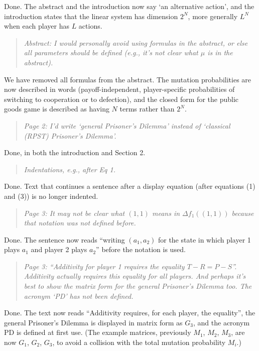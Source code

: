 \documentclass[11pt]{article}
\newenvironment{reviewerquote}
  {\begin{quote}\itshape}
  {\end{quote}}
\begin{document}
Done. The abstract and the introduction now say `an alternative action', and
the introduction states that the linear system has dimension \(2^N\), more
generally \(L^N\) when each player has \(L\) actions.

\begin{reviewerquote}
Abstract: I would personally avoid using formulas in the abstract, or else
all parameters should be defined (e.g., it's not clear what \(\mu\) is in the
abstract).
\end{reviewerquote}

We have removed all formulas from the abstract. The mutation probabilities
are now described in words (payoff-independent, player-specific probabilities
of switching to cooperation or to defection), and the closed form for the
public goods game is described as having \(N\) terms rather than \(2^N\).

\begin{reviewerquote}
Page 2: I'd write `general Prisoner's Dilemma' instead of `classical (RPST)
Prisoner's Dilemma'.
\end{reviewerquote}

Done, in both the introduction and Section 2.

\begin{reviewerquote}
Indentations, e.g., after Eq 1.
\end{reviewerquote}

Done. Text that continues a sentence after a display equation (after
equations (1) and (3)) is no longer indented.

\begin{reviewerquote}
Page 3: It may not be clear what \((1,1)\) means in
\(\Delta f_1((1,1))\) because that notation was not defined before.
\end{reviewerquote}

Done. The sentence now reads ``writing \((a_1, a_2)\) for the state in which
player 1 plays \(a_1\) and player 2 plays \(a_2\)'' before the notation is
used.

\begin{reviewerquote}
Page 3: ``Additivity for player 1 requires the equality \(T-R=P-S\)''.
Additivity actually requires this equality for all players. And perhaps it's
best to show the matrix form for the general Prisoner's Dilemma too. The
acronym `PD' has not been defined.
\end{reviewerquote}

Done. The text now reads ``Additivity requires, for each player, the
equality'', the general Prisoner's Dilemma is displayed in matrix form as
\(G_3\), and the acronym PD is defined at first use. (The example matrices,
previously \(M_1\), \(M_2\), \(M_3\), are now \(G_1\), \(G_2\), \(G_3\), to
avoid a collision with the total mutation probability \(M_i\).)
\end{document}
